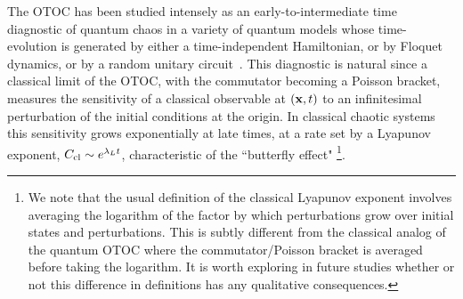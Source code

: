 \documentclass[aps,prl,reprint,superscriptaddress, longbibliography]{revtex4-1}
\begin{document}
The OTOC has been studied intensely as an early-to-intermediate time diagnostic of quantum chaos in a variety of quantum models whose time-evolution is generated by either a time-independent Hamiltonian\cite{KitaevSYK, ShenkerStanfordButterfly,LocalizedShocks,CotlerRM,RobertsStanford,GuQiStanford,GuQi_rcft,StanfordWeakCoupling,PatelDiffusiveMetal,ChowdhuryON,AleinerOTOC,
DoraMoessner,Galitski_lyapunov,LuitzScrambling,ProsenWeakChaos,MotrunichTFIM_otoc}, or by Floquet dynamics\cite{FradkinHuse,ChalkerFloquetChaos}, or by a random unitary circuit~\cite{FawziScrambling,HosurYoshida,opspreadAdam, opspreadCurt, TiborCons, KhemaniCons}. This diagnostic is natural since 
a classical limit of the OTOC, with the commutator becoming a Poisson bracket, measures the sensitivity of a classical observable at $({\bf x},t)$ to an infinitesimal perturbation of the initial conditions at the origin.
In classical chaotic systems this sensitivity grows exponentially at late times, at a rate set by a Lyapunov exponent,  $C_{\rm cl}\sim e^{\lambda_L t}$, characteristic of the ``butterfly effect" \footnote{We note that the usual definition of the classical Lyapunov exponent involves averaging the logarithm of the factor by which perturbations grow over initial states and perturbations. This is subtly different from the classical analog of the quantum OTOC where the commutator/Poisson bracket is averaged before taking the logarithm. It is worth exploring in future studies whether or not this difference in definitions has any qualitative consequences\cite{Galitski_lyapunov}.}.
\end{document}
